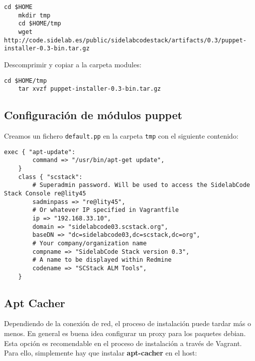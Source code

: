 \lstset{style=bashbasico}
\begin{lstlisting}[frame=trbl]
    cd $HOME
    mkdir tmp
    cd $HOME/tmp
    wget http://code.sidelab.es/public/sidelabcodestack/artifacts/0.3/puppet-installer-0.3-bin.tar.gz
\end{lstlisting}

\par Descomprimir y copiar a la carpeta modules:

\lstset{style=bashbasico}
\begin{lstlisting}[frame=trbl]
    cd $HOME/tmp
    tar xvzf puppet-installer-0.3-bin.tar.gz
\end{lstlisting}

\subsection{Configuración de módulos puppet}
\label{sub:conf-modulos-puppet}

\par Creamos un fichero \texttt{default.pp} en la carpeta \texttt{tmp} con el siguiente contenido:

\lstset{style=rubybasico}
\begin{lstlisting}[frame=trbl]
    exec { "apt-update":
        command => "/usr/bin/apt-get update",
    }
    class { "scstack":
        # Superadmin password. Will be used to access the SidelabCode Stack Console re@lity45
        sadminpass => "re@lity45",
        # Or whatever IP specified in Vagrantfile
        ip => "192.168.33.10", 
        domain => "sidelabcode03.scstack.org",
        baseDN => "dc=sidelabcode03,dc=scstack,dc=org",
        # Your company/organization name
        compname => "SidelabCode Stack version 0.3",
        # A name to be displayed within Redmine
        codename => "SCStack ALM Tools",
    }
\end{lstlisting}

\subsection{Apt Cacher}
\label{sub:apt-cacher}

\par Dependiendo de la conexión de red, el proceso de instalación puede tardar más o menos. En general es buena idea configurar un proxy para los paquetes debian. Esta opción es recomendable en el proceso de instalación a través de Vagrant. Para ello, simplemente hay que instalar \textbf{apt-cacher} en el host:

